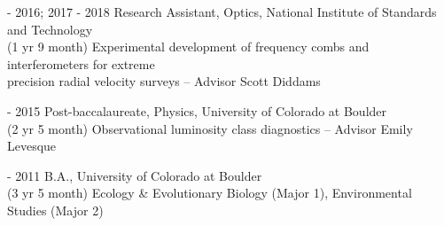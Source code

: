 \documentclass[10pt,preprint]{aastex}
\newcommand*{\xdash}[1][3em]{\rule[0.5ex]{#1}{0.7pt}}
\begin{document}
 - 2016; 2017 - 2018 \-\hspace{.22cm} Research Assistant, Optics, National Institute of Standards and Technology\\
(1 yr 9 month) \-\hspace{2.2cm}Experimental development of frequency combs and interferometers for extreme \\ \-\hspace{4.55cm}precision radial velocity surveys -- Advisor Scott Diddams 

 - 2015 \-\hspace{2.2cm} Post-baccalaureate, Physics, University of Colorado at Boulder \\
(2 yr 5 month) \-\hspace{2.1cm}Observational luminosity class diagnostics -- Advisor Emily Levesque

 - 2011 \-\hspace{2.2cm} B.A., University of Colorado at Boulder \\
(3 yr 5 month) \-\hspace{2.1cm}Ecology \& Evolutionary Biology (Major 1), Environmental Studies (Major 2) 





\end{document}
